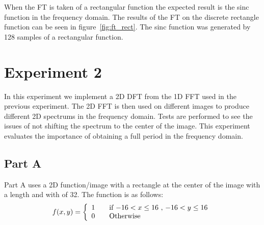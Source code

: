 \documentclass[letter]{article}
\begin{document}
When the FT is taken of a rectangular function the expected result is the sinc function in the frequency domain. The results of the FT on the discrete rectangle function can be seen in figure~\ref{fig:ft_rect}. The sinc function was generated by 128 samples of a rectangular function.
\section{Experiment 2}
In this experiment we implement a 2D DFT from the 1D FFT used in the previous experiment. The 2D FFT is then used on different images to produce different 2D spectrums in the frequency domain. Tests are performed to see the issues of not shifting the spectrum to the center of the image. This experiment evaluates the importance of obtaining a full period in the frequency domain.
\subsection{Part A}
Part A uses a 2D function/image with a rectangle at the center of the image with a length and with of 32. The function is as follows: $$f(x,y) = \left \{ \begin{array}{l l} 1 & \quad \text{if $-16 < x \leq 16$ , $-16 < y \leq 16$}\\ 0 & \quad \text{Otherwise}\end{array} \right.$$
\end{document}
